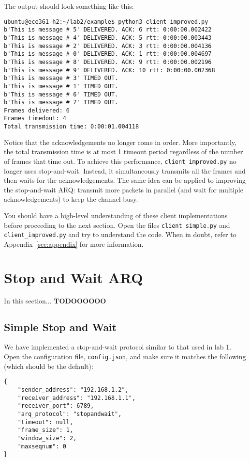 \documentclass[11pt]{article}
\begin{document}
The output should look something like this:
\begin{lstlisting}[style=ece361shell, caption={}]
ubuntu@ece361-h2:~/lab2/example$ python3 client_improved.py
b'This is message # 5' DELIVERED. ACK: 6 rtt: 0:00:00.002422
b'This is message # 4' DELIVERED. ACK: 5 rtt: 0:00:00.003443
b'This is message # 2' DELIVERED. ACK: 3 rtt: 0:00:00.004136
b'This is message # 0' DELIVERED. ACK: 1 rtt: 0:00:00.004697
b'This is message # 8' DELIVERED. ACK: 9 rtt: 0:00:00.002196
b'This is message # 9' DELIVERED. ACK: 10 rtt: 0:00:00.002368
b'This is message # 3' TIMED OUT.
b'This is message # 1' TIMED OUT.
b'This is message # 6' TIMED OUT.
b'This is message # 7' TIMED OUT.
Frames delivered: 6
Frames timedout: 4
Total transmission time: 0:00:01.004118
\end{lstlisting}

Notice that the acknowledgements no longer come in order.
More importantly, the total transmission time is at most 1 timeout period regardless of the number of frames that time out.
To achieve this performance, \texttt{client\_improved.py} no longer uses stop-and-wait.
Instead, it simultaneously transmits all the frames and then waits for the acknowledgements.
The same idea can be applied to improving the stop-and-wait ARQ: transmit more packets in parallel (and wait for multiple acknowledgements) to keep the channel busy.

You should have a high-level understanding of these client implementations before proceeding to the next section.
Open the files \texttt{client\_simple.py} and \texttt{client\_improved.py} and try to understand the code.
When in doubt, refer to Appendix~\ref{sec:appendix} for more information.

\section{Stop and Wait ARQ}
\label{sec:example}
In this section... \textbf{TODOOOOOO}

\subsection{Simple Stop and Wait}
We have implemented a stop-and-wait protocol similar to that used in lab 1.
Open the configuration file, \texttt{config.json}, and make sure it matches the following (which should be the default):
\begin{lstlisting}[style=ece361-shell-base, caption={Configuration For Small File}]
{
    "sender_address": "192.168.1.2",
    "receiver_address": "192.168.1.1",
    "receiver_port": 6789,
    "arq_protocol": "stopandwait",
    "timeout": null,
    "frame_size": 1,
    "window_size": 2,
    "maxseqnum": 0
}
\end{lstlisting}
\end{document}
